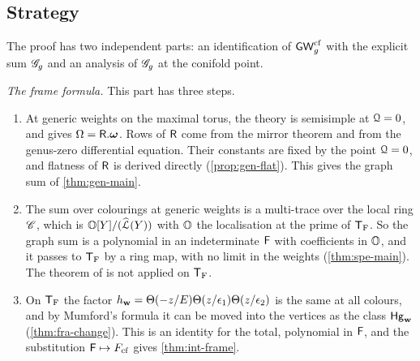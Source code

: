 \subsection{Strategy}
\label{sec:int-strategy}

The proof has two independent parts: an identification of $\mathsf{GW}^{\mathrm{cf}}_g$ with the explicit sum $\mathscr{G}_g$ and an analysis of $\mathscr{G}_g$ at the conifold point.

\emph{The frame formula.} This part has three steps.
\begin{enumerate}
\item At generic weights on the maximal torus, the theory is semisimple at $\mathcal{Q}=0$, and \cite{Tel12} gives $\Omega=\mathsf{R}.\boldsymbol{\omega}$. Rows of $\mathsf{R}$ come from the mirror theorem and from the genus-zero differential equation. Their constants are fixed by the point $\mathcal{Q}=0$, and flatness of $\mathsf{R}$ is derived directly (\cref{prop:gen-flat}). This gives the graph sum of \cref{thm:gen-main}.
\item The sum over colourings at generic weights is a multi-trace over the local ring $\mathscr{C}$, which is $\mathbb{O}[Y]/(\widehat{\mathcal{L}}(Y))$ with $\mathbb{O}$ the localisation at the prime of $\mathsf{T}_{\mathrm{F}}$. So the graph sum is a polynomial in an indeterminate $\mathsf{F}$ with coefficients in $\mathbb{O}$, and it passes to $\mathsf{T}_{\mathrm{F}}$ by a ring map, with no limit in the weights (\cref{thm:spe-main}). The theorem of \cite{Tel12} is not applied on $\mathsf{T}_{\mathrm{F}}$.
\item On $\mathsf{T}_{\mathrm{F}}$ the factor $h_{\mathbf{w}}=\Theta(-z/E)\Theta(z/\epsilon_1)\Theta(z/\epsilon_2)$ is the same at all colours, and by Mumford's formula it can be moved into the vertices as the class $\mathsf{Hg}_{\mathbf{w}}$ (\cref{thm:fra-change}). This is an identity for the total, polynomial in $\mathsf{F}$, and the substitution $\mathsf{F}\mapsto F_{\mathrm{cf}}$ gives \cref{thm:int-frame}.
\end{enumerate}

